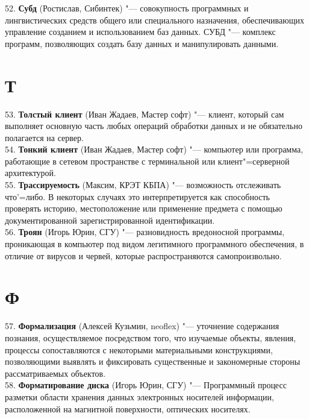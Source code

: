 \documentclass[14 pt]{extarticle}
\begin{document}
    52. \textbf{Субд} (Ростислав, Сибинтек) "--- совокупность программных и лингвистических средств общего или специального назначения, обеспечивающих управление созданием и использованием баз данных. СУБД "--- комплекс программ, позволяющих создать базу данных и манипулировать данными. \\
    
\section*{Т}
    53. \textbf{Толстый клиент} (Иван Жадаев, Мастер софт) "--- клиент, который сам выполняет основную часть любых операций обработки данных и не обязательно полагается на сервер. \\
    
    54. \textbf{Тонкий клиент} (Иван Жадаев, Мастер софт) "--- компьютер или программа, работающие в сетевом пространстве с терминальной или клиент"=серверной архитектурой. \\
    
    55. \textbf{Трассируемость} (Максим, КРЭТ КБПА) "--- возможность отслеживать что'=либо. В некоторых случаях это интерпретируется как способность проверять историю, местоположение или применение предмета с помощью документированной зарегистрированной идентификации. \\
    
    56. \textbf{Троян} (Игорь Юрин, СГУ) "--- разновидность вредоносной программы, проникающая в компьютер под видом легитимного программного обеспечения, в отличие от вирусов и червей, которые распространяются самопроизвольно. \\
    
\section*{Ф}
    57. \textbf{Формализация} (Алексей Кузьмин, neoflex) "---  уточнение содержания познания, осуществляемое посредством того, что изучаемые объекты, явления, процессы сопоставляются с некоторыми материальными конструкциями, позволяющими выявлять и фиксировать существенные и закономерные стороны рассматриваемых объектов. \\
    
    58. \textbf{Форматирование диска} (Игорь Юрин, СГУ) "--- Программный процесс разметки области хранения данных электронных носителей информации, расположенной на магнитной поверхности, оптических носителях. \\
    
\end{document}
